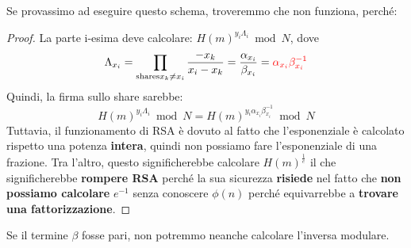 Se provassimo ad eseguire questo schema, troveremmo che non funziona, perché:
\begin{proof}
La parte i-esima deve calcolare: $H(m)^{y_i\Lambda_i}\bmod{N}$, dove 
\[\Lambda_{x_i}=\prod_{\text{shares} x_k\ne x_i}\frac{-x_k}{x_i-x_k}=\frac{\alpha_{x_i}}{\beta_{x_i}}=\textcolor{red}{\alpha_{x_i}\beta_{x_i}^{-1}}\]
Quindi, la firma sullo share sarebbe:
\[H(m)^{y_i\Lambda_i}\bmod{N}=H(m)^{y_i\alpha_{x_i}\beta_{x_i}^{-1}}\bmod{N}\]
Tuttavia, il funzionamento di RSA è dovuto al fatto che l'esponenziale è calcolato rispetto una potenza \textbf{intera}, quindi non possiamo fare l'esponenziale di una frazione. Tra l'altro, questo significherebbe calcolare $H(m)^\frac{1}{e}$ il che significherebbe \textbf{rompere RSA} perché la sua sicurezza \textbf{risiede} nel fatto che \textbf{non possiamo calcolare} $e^{-1}$ senza conoscere $\phi(n)$ perché equivarrebbe a \textbf{trovare una fattorizzazione}.
\end{proof}
\begin{remark}
Se il termine $\beta$ fosse pari, non potremmo neanche calcolare l'inversa modulare.
\end{remark}
